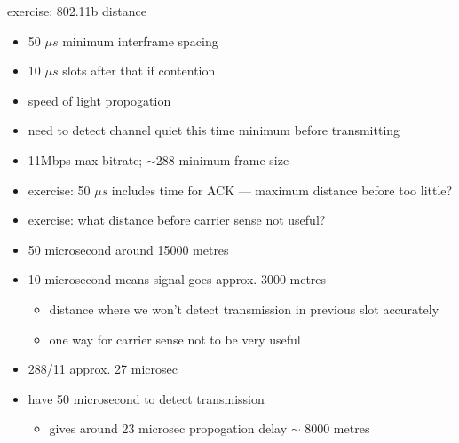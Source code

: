 \begin{frame}{exercise: 802.11b distance}
    \begin{itemize}
    \item 50 $\mu s$ minimum interframe spacing
    \item 10 $\mu s$ slots after that if contention
    \item speed of light propogation
    \item need to detect channel quiet this time minimum before transmitting
    \item 11Mbps max bitrate; $\sim$288 minimum frame size
    \vspace{.5cm}
    \item exercise: 50 $\mu s$ includes time for ACK --- maximum distance before too little?
    \item exercise: what distance before carrier sense not useful?
    \end{itemize}
\end{frame}

\begin{frame}{}
\begin{itemize}
\item 50 microsecond around 15000 metres
\item 10 microsecond means signal goes approx. 3000 metres
    \begin{itemize}
    \item distance where we won't detect transmission in previous slot accurately
    \item one way for carrier sense not to be very useful
    \end{itemize}
\item 288/11 approx. 27 microsec 
\item have 50 microsecond to detect transmission
    \begin{itemize}
    \item gives around 23 microsec propogation delay $\sim$ 8000 metres
    \end{itemize}
\end{itemize}
\end{frame}
